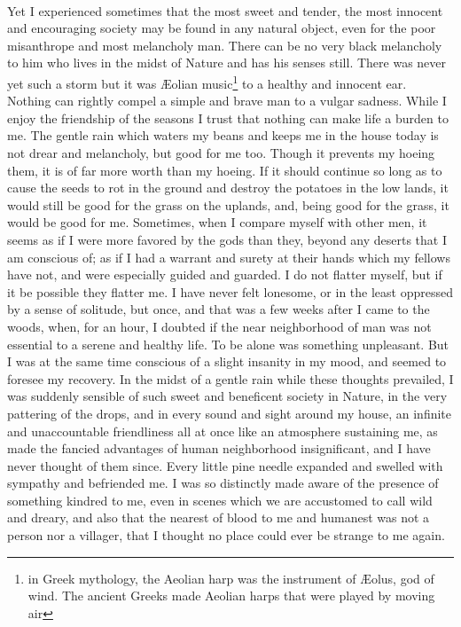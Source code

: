 \documentclass[letterpaper,12pt]{article}
\begin{document}
\paragraph{}
Yet I experienced sometimes that the most sweet and tender, the most innocent
and encouraging society may be found in any natural object, even for the poor
misanthrope and most melancholy man. There can be no very black melancholy to
him who lives in the midst of Nature and has his senses still. There was never
yet such a storm but it was \AE{}olian music\footnote{in Greek mythology, the
    Aeolian harp was the instrument of \AE{}olus, god of wind. The ancient
    Greeks made Aeolian harps that were played by moving air} to a healthy and
innocent ear.  Nothing can rightly compel a simple and brave man to a vulgar
sadness. While I enjoy the friendship of the seasons I trust that nothing can
make life a burden to me. The gentle rain which waters my beans and keeps me in
the house today is not drear and melancholy, but good for me too. Though it
prevents my hoeing them, it is of far more worth than my hoeing. If it should
continue so long as to cause the seeds to rot in the ground and destroy the
potatoes in the low lands, it would still be good for the grass on the uplands,
and, being good for the grass, it would be good for me. Sometimes, when I
compare myself with other men, it seems as if I were more favored by the gods
than they, beyond any deserts that I am conscious of; as if I had a warrant and
surety at their hands which my fellows have not, and were especially guided and
guarded. I do not flatter myself, but if it be possible they flatter me. I have
never felt lonesome, or in the least oppressed by a sense of solitude, but once,
and that was a few weeks after I came to the woods, when, for an hour, I doubted
if the near neighborhood of man was not essential to a serene and healthy life.
To be alone was something unpleasant. But I was at the same time conscious of a
slight insanity in my mood, and seemed to foresee my recovery. In the midst of a
gentle rain while these thoughts prevailed, I was suddenly sensible of such
sweet and beneficent society in Nature, in the very pattering of the drops, and
in every sound and sight around my house, an infinite and unaccountable
friendliness all at once like an atmosphere sustaining me, as made the fancied
advantages of human neighborhood insignificant, and I have never thought of them
since. Every little pine needle expanded and swelled with sympathy and
befriended me. I was so distinctly made aware of the presence of something
kindred to me, even in scenes which we are accustomed to call wild and dreary,
and also that the nearest of blood to me and humanest was not a person nor a
villager, that I thought no place could ever be strange to me again.
\end{document}
